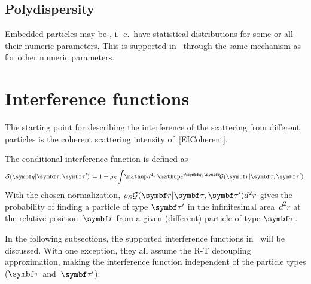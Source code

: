 
\subsection{Polydispersity}

%
%
%
%
Embedded particles may be , i.~e.\ have statistical distributions
for some or all their numeric parameters.
This is supported in \BornAgain\ through the same mechanism
as for other numeric parameters.




\section{Interference functions}

The starting point for describing the interference of the scattering from different
particles is the coherent scattering intensity of~\cref{EICoherent}.

The conditional interference function is defined as
\begin{equation}
  \SD(\q |\v\tau,\v\tau')
  \coloneqq 1 + \rho_S \int\!\d^2r\, \e^{i\q_\plll\r}\! \GD(\r|\v\tau,\v\tau').
\end{equation}
With the chosen normalization, $\rho_S \GD(\r|\v\tau,\v\tau') d^2r$ gives the probability of
finding a particle of type $\v\tau'$ in the infinitesimal area~$d^2r$
at the relative position~$\r$ from
a given (different) particle of type $\v\tau$.

In the following subsections,
the supported interference functions in \BornAgain\ will be discussed.
With one exception,
they all assume the R-T decoupling approximation, making the interference function
independent of the particle types ($\v\tau$ and~$\v\tau'$).


